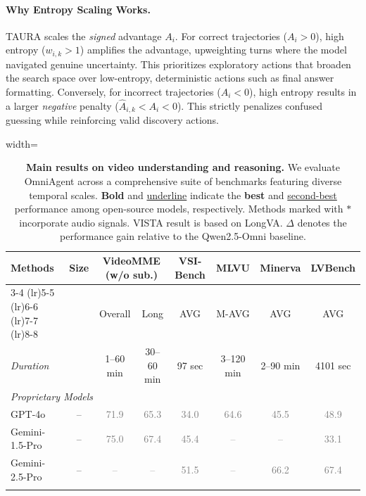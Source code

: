 \documentclass{article}
\theoremstyle{plain}
\theoremstyle{definition}
\theoremstyle{remark}
\newcommand{\gv}[1]{\textcolor{gray}{#1}}
\begin{document}
\paragraph{Why Entropy Scaling Works.}
TAURA scales the \textit{signed} advantage $A_i$. For correct trajectories ($A_i > 0$), high entropy ($w_{i,k} > 1$) amplifies the advantage, upweighting turns where the model navigated genuine uncertainty. This prioritizes exploratory actions that broaden the search space over low-entropy, deterministic actions such as final answer formatting. Conversely, for incorrect trajectories ($A_i < 0$), high entropy results in a larger \textit{negative} penalty ($\hat{A}_{i,k} < A_{i} < 0$). This strictly penalizes confused guessing while reinforcing valid discovery actions.


\begin{table}[t]
\caption{\textbf{Main results on video understanding and reasoning.} We evaluate OmniAgent across a comprehensive suite of benchmarks featuring diverse temporal scales. \textbf{Bold} and \underline{underline} indicate the \textbf{best} and \underline{second-best} performance among open-source models, respectively. Methods marked with $*$ incorporate audio signals. VISTA result is based on LongVA. $\Delta$ denotes the performance gain relative to the Qwen2.5-Omni baseline.}
\label{tab:main-results}
\vspace{-2mm}
\begin{center}
\begin{normalsize} 
\begin{adjustbox}{width=\textwidth}
\setlength{\tabcolsep}{8pt} 
\renewcommand{\arraystretch}{1.1} 
\begin{tabular}{l c cc cccc}
\toprule
\multirow{3}{*}{\textbf{Methods}} & 
\multirow{3}{*}{\textbf{Size}} & \multicolumn{2}{c}{\textbf{VideoMME (w/o sub.)}} & \textbf{VSI-Bench} & \textbf{MLVU} & \textbf{Minerva} & \textbf{LVBench} \\
\cmidrule(lr){3-4} \cmidrule(lr){5-5} \cmidrule(lr){6-6} \cmidrule(lr){7-7} \cmidrule(lr){8-8}

& & Overall & Long & AVG & M-AVG & AVG & AVG \\
\midrule

\textit{Duration} & &  1--60 min &  30--60 min &  97 sec &  3--120 min &  2--90 min &  4101 sec \\
\midrule

\multicolumn{8}{l}{\textit{Proprietary Models}} \\
GPT-4o~\cite{gpt4o} & -- & \gv{71.9} & \gv{65.3} & \gv{34.0} & \gv{64.6} & \gv{45.5} & \gv{48.9} \\
Gemini-1.5-Pro~\cite{team2024gemini} & -- & \gv{75.0} & \gv{67.4} & \gv{45.4} & \gv{--} & \gv{--} & \gv{33.1} \\
Gemini-2.5-Pro~\cite{comanici2025gemini} & -- & \gv{--} & \gv{--} & \gv{51.5} & \gv{--} & \gv{66.2} & \gv{67.4} \\
\midrule \addlinespace[0.2em]


\end{tabular}
\end{adjustbox}
\end{normalsize}
\end{center}
\end{table}
\end{document}
